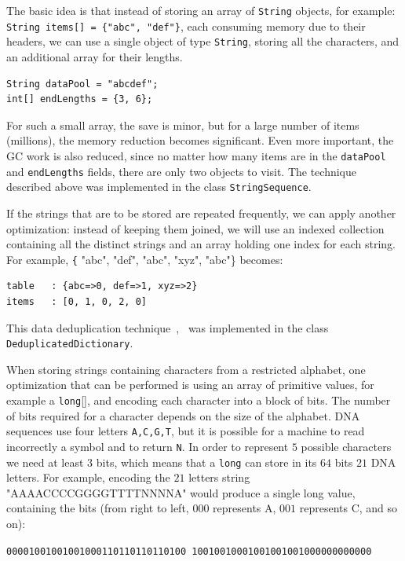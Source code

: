 \documentclass[a4paper,twoside]{article}
\begin{document}

The basic idea is that instead of storing an array of {\texttt{String}} objects, for example:
{\tt String items[] = \{"abc", "def"\}}, each consuming memory due to their headers, we can use 
a single object of type {\texttt{String}}, storing all the characters, and an additional array for their lengths.
\begin{verbatim}
String dataPool = "abcdef";
int[] endLengths = {3, 6};
\end{verbatim}

For such a small array, the save is minor, but for a large number of items (millions), the memory reduction becomes significant.
Even more important, the GC work is also reduced, since no matter how many items are in the {\texttt{dataPool}} and {\texttt{endLengths}} fields, there are only two objects to visit.
The technique described above was implemented in the class {\texttt{StringSequence}}.

If the strings that are to be stored are repeated frequently, we can apply another optimization:
instead of keeping them joined, we will use an indexed collection containing all the distinct strings and an array holding one index for each string.
For example, {\texttt{\{} "abc", "def", "abc", "xyz", "abc"\}} becomes:
\begin{verbatim}
table   : {abc=>0, def=>1, xyz=>2}
items   : [0, 1, 0, 2, 0]
\end{verbatim}
This data deduplication technique~\cite{he:2010},~\cite{manogar:2014} was implemented in the class {\texttt{DeduplicatedDictionary}}.

When storing strings containing characters from a restricted alphabet, one optimization that can be performed is using an array of primitive values, for example a {\texttt{long}[]}, and encoding each character into a block of bits.
The number of bits required for a character depends on the size of the alphabet.
DNA sequences use four letters {\texttt{A,C,G,T}}, but it is possible for a machine to read incorrectly a symbol and to return {\texttt{N}}.
In order to represent $5$ possible characters we need at least $3$ bits,
which means that a {\texttt{long}} can store in its $64$ bits $21$ DNA letters.
For example, encoding the $21$ letters string "AAAACCCCGGGGTTTTNNNNA" would produce a single long value, containing the bits (from right to left, $000$ represents A, $001$ represents C, and so on):\\
{\texttt{00001001001001000110110110110100
10010010001001001001000000000000}

}
\end{document}
